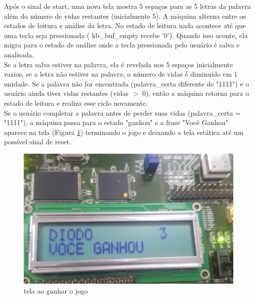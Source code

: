 \documentclass[a4paper,12pt,twoside]{article}
\begin{document}
Após o sinal de start, uma nova tela mostra 5 espaços para as 5 letras da palavra além do número de vidas restantes (inicialmente 5). A máquina alterna entre os estados de leitura e análise da letra. No estado de leitura nada acontece até que uma tecla seja pressionada ( kb\_buf\_empty recebe '0'). Quando isso aconte, ela migra para o estado de análise onde a tecla pressionada pelo usuário é salva e analisada. \\
Se a letra salva estiver na palavra, ela é revelada nos 5 espaços inicialmente vazios, se a letra não estiver na palavra, o número de vidas é diminuído em 1 unidade. Se a palavra não for encontrada (palavra\_certa diferente de "1111") e o usuário ainda tiver vidas restantes (vidas $>$ 0), então a máquina retorna para o estado de leitura e realiza esse ciclo novamente. 
\\
Se o usuário completar a palavra antes de perder suas vidas (palavra\_certa = "1111"), a máquina passa para o estado "ganhou" e a frase "Você Ganhou" aparece na tela (Figura \ref{fig:ganhou}) terminando o jogo e deixando a tela estática até um possível sinal de reset.
\begin{figure}[H]
\centering
\includegraphics[scale=0.1]{ganhou.jpg}
\caption{tela ao ganhar o jogo}
\label{fig:ganhou}
\end{figure}
\end{document}
